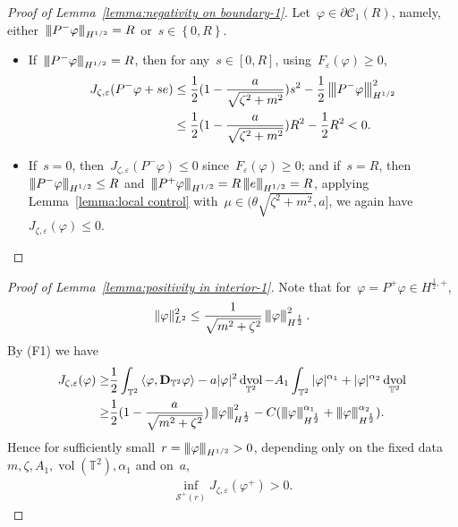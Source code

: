 \documentclass[10pt,a4paper]{amsart}
\newcommand{\tnorm}[1]{%
  \left\vert\kern-0.3ex\left\vert\kern-0.3ex\left\vert #1 \right\vert\kern-0.3ex\right\vert\kern-0.3ex\right\vert
}
\newcommand{\p}{\partial}
\newcommand{\T}{\mathbb{T}}
\newcommand{\dd}{\mathop{}\!\mathrm{d}}
\newcommand{\eps}{\varepsilon}
\newcommand{\pD}{\mathbf{D}}
\newcommand{\Abracket}[1]{\left<#1\right>} %
\newcommand{\braces}[1]{\left\{#1\right\}} %
\DeclareMathOperator{\dv}{\dd{vol}}
\DeclareMathOperator{\vol}{vol}
\begin{document}
\begin{proof}[Proof of Lemma~\ref{lemma:negativity on boundary-1}]
    Let~$\varphi\in\p\mathscr{C}_1(R)$, namely, either~$\tnorm{P^-\varphi}_{H^{1/2}}=R$ or~$s\in \braces{0,R}$.
    \begin{itemize}
        \item If~$\tnorm{P^-\varphi}_{H^{1/2}}=R$, then for any~$s\in[0,R]$, using~$F_\eps(\varphi)\geq 0$,
            \begin{align}
                J_{\zeta,\eps}(P^-\varphi+s e)&\leq \frac{1}{2}(1-\frac{a}{\sqrt{\zeta^2+m^2}})s^2 -  \frac{1}{2}\tnorm{P^-\varphi}^2_{H^{1/2}} \\
                &\leq \frac{1}{2}(1-\frac{a}{\sqrt{\zeta^2+m^2}})R^2 -\frac{1}{2}R^2< 0.
            \end{align}
        \item If~$s=0$, then~$J_{\zeta,\eps}(P^-\varphi)\leq 0$ since~$F_\eps(\varphi)\geq 0$; and if~$s=R$, then~$\tnorm{P^-\varphi}_{H^{1/2}}\leq R$ and~$\tnorm{P^+\varphi}_{H^{1/2}}= R\tnorm{e}_{H^{1/2}}=R$, applying Lemma~\ref{lemma:local control} with~$\mu \in (\theta\sqrt{\zeta^2+m^2}, a]$, we again have~$J_{\zeta,\eps}(\varphi)\leq 0$.
    \end{itemize}
\end{proof}

\begin{proof}[Proof of Lemma~\ref{lemma:positivity in interior-1}]
Note that for~$\varphi=P^+\varphi\in H^{\frac{1}{2},+}$,
\begin{align}
    \|\varphi\|^2_{L^2}\leq \frac{1}{\sqrt{m^2+\zeta^2}}\tnorm{\varphi}^2_{H^{\frac{1}{2}}}.
\end{align}
By (F1) we have 
\begin{align}
    J_{\zeta,\eps}(\varphi)
    \geq &  \frac{1}{2}\int_{\mathbb{T}^2} \Abracket{\varphi, \pD_{\T^2}\varphi} - a|\varphi|^2 \dv_{\T^2}
        - A_1\int_{\mathbb{T}^2} |\varphi|^{\alpha_1} + |\varphi|^{\alpha_2}\dv_{\T^2}\\
    \geq& \frac{1}{2}(1-\frac{a}{\sqrt{m^2+\zeta^2}})\tnorm{\varphi}^2_{H^{\frac{1}{2}}}
    -C(\tnorm{\varphi}^{\alpha_1}_{H^{\frac{1}{2}}}+\tnorm{\varphi}^{\alpha_2}_{H^{\frac{1}{2}}}).
\end{align}
Hence for sufficiently small~$r=\tnorm{\varphi}_{H^{1/2}}>0$, depending only on the fixed data~$m,\zeta,A_1, \vol(\T^2),\alpha_1$ and on~$a$,
\begin{align}
    \inf_{\mathscr{S}^+(r)} J_{\zeta,\eps}(\varphi^+)>0.
\end{align}
\end{proof}
\end{document}
